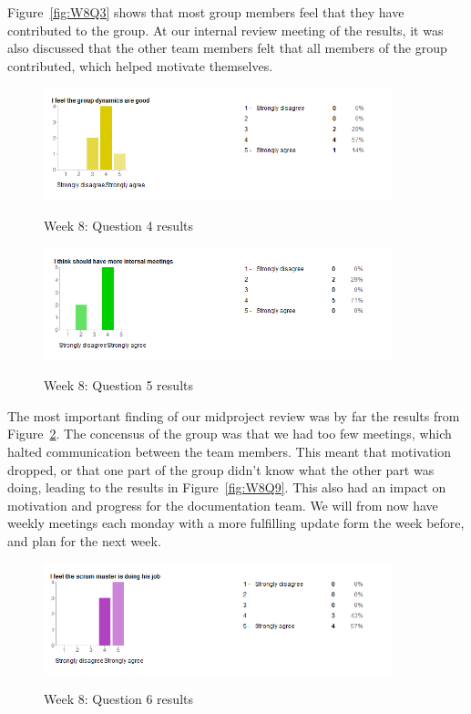 Figure~\ref{fig:W8Q3} shows that most group members feel that they have contributed to the group. At our internal review meeting of the results, it was also discussed that the other team members felt that all members of the group contributed, which helped motivate themselves. 

\begin{figure}[th!]
\caption{Week 8: Question 4 results}
\centering
\includegraphics[width=0.9\textwidth]{evaluation/week_8_images/group_dynamics}
\label{fig:W8Q4}
\end{figure}

\begin{figure}[th!]
\caption{Week 8: Question 5 results}
\centering
\includegraphics[width=0.9\textwidth]{evaluation/week_8_images/internal_meetings}
\label{fig:W8Q5}
\end{figure}
 The most important finding of our midproject review was by far the results from Figure~\ref{fig:W8Q5}. The concensus of the group was that we had too few meetings, which halted communication between the team members. This meant that motivation dropped, or that one part of the group didn't know what the other part was doing, leading to the results in Figure~\ref{fig:W8Q9}. This also had an impact on motivation and progress for the documentation team. We will from now have weekly meetings each monday with a more fulfilling update form the week before, and plan for the next week.

\begin{figure}[th!]
\caption{Week 8: Question 6 results}
\centering
\includegraphics[width=0.9\textwidth]{evaluation/week_8_images/scrum_master}
\label{fig:W8Q6}
\end{figure}

